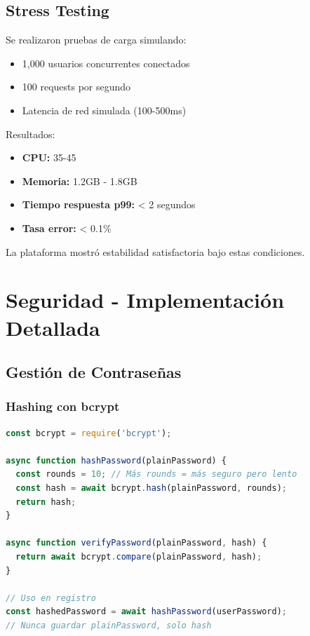 \documentclass[a4paper]{report}
\begin{document}
\section{Stress Testing}

Se realizaron pruebas de carga simulando:

\begin{itemize}
  \item 1,000 usuarios concurrentes conectados
  \item 100 requests por segundo
  \item Latencia de red simulada (100-500ms)
\end{itemize}

Resultados:

\begin{itemize}
  \item \textbf{CPU:} 35-45%
  \item \textbf{Memoria:} 1.2GB - 1.8GB
  \item \textbf{Tiempo respuesta p99:} < 2 segundos
  \item \textbf{Tasa error:} < 0.1\%
\end{itemize}

La plataforma mostró estabilidad satisfactoria bajo estas condiciones.

\newpage

\chapter{Seguridad - Implementación Detallada}

\section{Gestión de Contraseñas}

\subsection{Hashing con bcrypt}

\begin{lstlisting}[language=JavaScript,
  caption={Hashing seguro de contraseñas}]
const bcrypt = require('bcrypt');

async function hashPassword(plainPassword) {
  const rounds = 10; // Más rounds = más seguro pero lento
  const hash = await bcrypt.hash(plainPassword, rounds);
  return hash;
}

async function verifyPassword(plainPassword, hash) {
  return await bcrypt.compare(plainPassword, hash);
}

// Uso en registro
const hashedPassword = await hashPassword(userPassword);
// Nunca guardar plainPassword, solo hash
\end{lstlisting}
\end{document}
